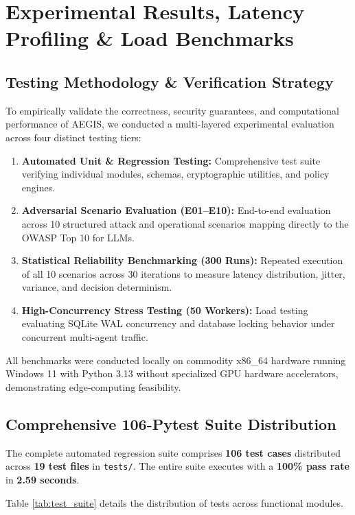 \chapter{Experimental Results, Latency Profiling \& Load Benchmarks}
\label{chap:results}

\section{Testing Methodology \& Verification Strategy}
To empirically validate the correctness, security guarantees, and computational performance of AEGIS, we conducted a multi-layered experimental evaluation across four distinct testing tiers:
\begin{enumerate}
    \item \textbf{Automated Unit \& Regression Testing:} Comprehensive test suite verifying individual modules, schemas, cryptographic utilities, and policy engines.
    \item \textbf{Adversarial Scenario Evaluation (E01--E10):} End-to-end evaluation across 10 structured attack and operational scenarios mapping directly to the OWASP Top 10 for LLMs.
    \item \textbf{Statistical Reliability Benchmarking (300 Runs):} Repeated execution of all 10 scenarios across 30 iterations to measure latency distribution, jitter, variance, and decision determinism.
    \item \textbf{High-Concurrency Stress Testing (50 Workers):} Load testing evaluating SQLite WAL concurrency and database locking behavior under concurrent multi-agent traffic.
\end{enumerate}

All benchmarks were conducted locally on commodity x86\_64 hardware running Windows 11 with Python 3.13 without specialized GPU hardware accelerators, demonstrating edge-computing feasibility.

\section{Comprehensive 106-Pytest Suite Distribution}
The complete automated regression suite comprises \textbf{106 test cases} distributed across \textbf{19 test files} in \texttt{tests/}. The entire suite executes with a \textbf{100\% pass rate} in \textbf{2.59 seconds}.

Table \ref{tab:test_suite} details the distribution of tests across functional modules.

